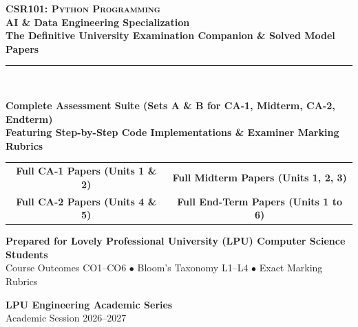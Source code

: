 \begin{titlepage}
\pagecolor{LPUNavy}
\color{white}
\vspace*{1.5cm}

\begin{center}
    {\Huge \bfseries \scshape CSR101: Python Programming}\\[5mm]
    {\LARGE \bfseries AI \& Data Engineering Specialization}\\[3mm]
    {\large \bfseries The Definitive University Examination Companion \& Solved Model Papers}\\[8mm]
    {\color{LPUOrange}\rule{0.8\textwidth}{2pt}}\\[10mm]

    \begin{tcolorbox}[enhanced, width=0.9\textwidth, colback=white, colframe=LPUOrange, boxrule=1.5pt, arc=3mm, halign=center]
        \color{DarkSlate}
        \vspace{2mm}
        {\Large\bfseries Complete Assessment Suite (Sets A \& B for CA-1, Midterm, CA-2, Endterm)}\\[3mm]
        {\large\bfseries Featuring Step-by-Step Code Implementations \& Examiner Marking Rubrics}\\[3mm]
        \begin{tabular}{cc}
            \color{LPUNavy}\textbf{Full CA-1 Papers (Units 1 \& 2)} & \quad \color{LPUNavy}\textbf{Full Midterm Papers (Units 1, 2, 3)} \\
            \color{LPUNavy}\textbf{Full CA-2 Papers (Units 4 \& 5)} & \quad \color{LPUNavy}\textbf{Full End-Term Papers (Units 1 to 6)} \\
        \end{tabular}
        \vspace{2mm}
    \end{tcolorbox}

    \vfill

    {\large \bfseries Prepared for Lovely Professional University (LPU) Computer Science Students}\\[2mm]
    {\small Course Outcomes CO1--CO6 $\bullet$ Bloom's Taxonomy L1--L4 $\bullet$ Exact Marking Rubrics}\\[10mm]

    \begin{tcolorbox}[width=0.65\textwidth, colback=LPUNavy!85!black, colframe=white, boxrule=0.5pt, halign=center]
        \color{white}
        \textbf{LPU Engineering Academic Series}\\[1mm]
        {\footnotesize Academic Session 2026--2027}
    \end{tcolorbox}
    \vspace*{1cm}
\end{center}
\end{titlepage}
\nopagecolor
\newpage
